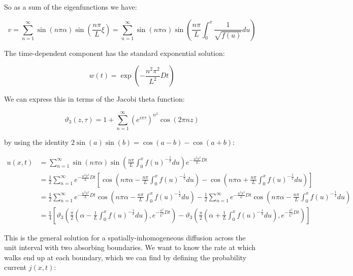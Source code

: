 \documentclass[11pt]{article} %
\begin{document}
So as a sum of the eigenfunctions we have:

\begin{equation}
v = \sum^{\infty}_{n=1}\sin(n\pi\alpha)\sin\left(\frac{n\pi}{L}\xi\right) = \sum^{\infty}_{n=1}\sin(n\pi\alpha)\sin\left(\frac{n\pi}{L}\int^{x}_{0}\frac{1}{\sqrt{f(u)}}du\right)
\end{equation}

The time-dependent component has the standard exponential solution:

\begin{equation}
w(t) = \exp\left(-\frac{n^2\pi^2}{L^2}Dt\right)
\end{equation}

We can express this in terms of the Jacobi theta function:

\begin{equation}
\vartheta_{3}(z, \tau) = 1 + \sum^{\infty}_{n=1}(e^{i\pi\tau})^{n^2}\cos(2\pi n z)
\end{equation}

by using the identity $2\sin(a)\sin(b) = \cos(a-b) - \cos(a+b)$:

\begin{align}
u(x,t) &= \sum^{\infty}_{n=1}\sin(n\pi\alpha)\sin\left(\frac{n\pi}{L}\int^{x}_{0}f(u)^{-\frac{1}{2}}du\right)e^{-\frac{n^2\pi^{2}}{L}Dt}\\
&= \frac{1}{2}\sum^{\infty}_{n=1}e^{-\frac{n^2\pi^{2}}{L}Dt}\left[\cos\left(n\pi\alpha - \frac{n\pi}{L}\int^{x}_{0}f(u)^{-\frac{1}{2}}du\right) - \cos\left(n\pi\alpha + \frac{n\pi}{L}\int^{x}_{0}f(u)^{-\frac{1}{2}}du\right) \right] \\
&= \frac{1}{2}\sum^{\infty}_{n=1}e^{-\frac{n^2\pi^{2}}{L}Dt}\cos\left(n\pi\alpha - \frac{n\pi}{L}\int^{x}_{0}f(u)^{-\frac{1}{2}}du\right) - \frac{1}{2}\sum^{\infty}_{n=1}e^{-\frac{n^2\pi^{2}}{L}Dt}\cos\left(n\pi\alpha - \frac{n\pi}{L}\int^{x}_{0}f(u)^{-\frac{1}{2}}du\right) \nonumber \\
&= \frac{1}{4}\left[\vartheta_{3}\left(\frac{\pi}{2}\left(\alpha - \frac{1}{L}\int^{x}_{0}f(u)^{-\frac{1}{2}}du\right), e^{-\frac{\pi^{2}}{L^{2}}Dt}\right) - \vartheta_{3}\left(\frac{\pi}{2}\left(\alpha + \frac{1}{L}\int^{x}_{0}f(u)^{-\frac{1}{2}}du\right), e^{-\frac{\pi^{2}}{L^{2}}Dt}\right) \right]
\end{align}

This is the general solution for a spatially-inhomogeneous diffusion across the unit interval with two absorbing boundaries. We want to know the rate at which walks end up at each boundary, which we can find by defining the probability current $j(x,t)$:
\end{document}
